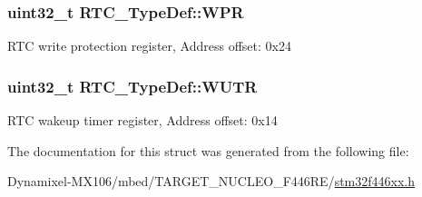 \subsubsection[{\texorpdfstring{W\+PR}{WPR}}]{ uint32\+\_\+t R\+T\+C\+\_\+\+Type\+Def\+::\+W\+PR}\hypertarget{struct_r_t_c___type_def_ad54765af56784498a3ae08686b79a1ff}{}\label{struct_r_t_c___type_def_ad54765af56784498a3ae08686b79a1ff}
R\+TC write protection register, Address offset\+: 0x24 
\subsubsection[{\texorpdfstring{W\+U\+TR}{WUTR}}]{ uint32\+\_\+t R\+T\+C\+\_\+\+Type\+Def\+::\+W\+U\+TR}\hypertarget{struct_r_t_c___type_def_ad93017bb0a778a2aad9cd71211fc770a}{}\label{struct_r_t_c___type_def_ad93017bb0a778a2aad9cd71211fc770a}
R\+TC wakeup timer register, Address offset\+: 0x14 

The documentation for this struct was generated from the following file\+:\begin{DoxyCompactItemize}
\item 
Dynamixel-\/\+M\+X106/mbed/\+T\+A\+R\+G\+E\+T\+\_\+\+N\+U\+C\+L\+E\+O\+\_\+\+F446\+R\+E/\hyperlink{stm32f446xx_8h}{stm32f446xx.\+h}\end{DoxyCompactItemize}
